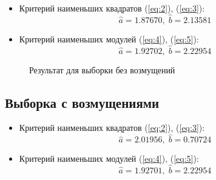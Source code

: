 \documentclass{article}
\begin{document}
\begin{itemize}
	\item Критерий наименьших квадратов (\ref{eq:2}), (\ref{eq:3}):
	$$
	\widehat{a} = 1.87670, \; \widehat{b} = 2.13581
	$$
	\item Критерий наименьших модулей (\ref{eq:4}), (\ref{eq:5}):
	$$
	\widehat{a} = 1.92702, \; \widehat{b} = 2.22954
	$$
\end{itemize}

\begin{figure}[h]
\caption{Результат для выборки без возмущений}
\label{i:1}
\end{figure}

\newpage
\subsection{Выборка с возмущениями}

\begin{itemize}
	\item Критерий наименьших квадратов (\ref{eq:2}), (\ref{eq:3}):
	$$
	\widehat{a} = 2.01956, \; \widehat{b} = 0.70724
	$$
	\item Критерий наименьших модулей (\ref{eq:4}), (\ref{eq:5}):
	$$
	\widehat{a} = 1.92701, \; \widehat{b} = 2.22954
	$$
\end{itemize}
\end{document}
